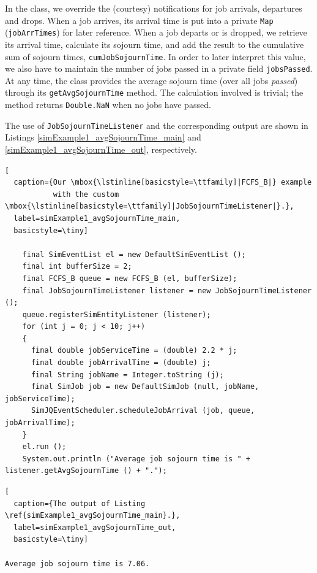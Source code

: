\documentclass[12pt]{book}
\begin{document}
In the class, we override the (courtesy) notifications for job arrivals,
  departures and drops.
When a job arrives, its arrival time is put into a private \lstinline|Map| (\lstinline|jobArrTimes|)
  for later reference.
When a job departs or is dropped,
  we retrieve its arrival time,
  calculate its sojourn time,
  and add the result to the cumulative sum
  of sojourn times, \lstinline|cumJobSojournTime|.
In order to later interpret this value,
  we also have to maintain the number of jobs passed
  in a private field \lstinline|jobsPassed|.
At any time,
  the class provides the average sojourn time (over all jobs {\em passed\/})
  through its \lstinline|getAvgSojournTime| method.
The calculation involved is trivial;
  the method returns \lstinline|Double.NaN| when
  no jobs have passed.

The use of \lstinline|JobSojournTimeListener| and the corresponding output
  are shown in Listings \ref{simExample1_avgSojournTime_main}
  and \ref{simExample1_avgSojournTime_out}, respectively.

\begin{lstlisting}[
  caption={Our \mbox{\lstinline[basicstyle=\ttfamily]|FCFS_B|} example
           with the custom \mbox{\lstinline[basicstyle=\ttfamily]|JobSojournTimeListener|}.},
  label=simExample1_avgSojournTime_main,
  basicstyle=\tiny]

    final SimEventList el = new DefaultSimEventList ();
    final int bufferSize = 2;
    final FCFS_B queue = new FCFS_B (el, bufferSize);
    final JobSojournTimeListener listener = new JobSojournTimeListener ();
    queue.registerSimEntityListener (listener);
    for (int j = 0; j < 10; j++)
    {
      final double jobServiceTime = (double) 2.2 * j;
      final double jobArrivalTime = (double) j;
      final String jobName = Integer.toString (j);
      final SimJob job = new DefaultSimJob (null, jobName, jobServiceTime);
      SimJQEventScheduler.scheduleJobArrival (job, queue, jobArrivalTime);
    }
    el.run ();
    System.out.println ("Average job sojourn time is " + listener.getAvgSojournTime () + ".");

\end{lstlisting}

\begin{lstlisting}[
  caption={The output of Listing \ref{simExample1_avgSojournTime_main}.},
  label=simExample1_avgSojournTime_out,
  basicstyle=\tiny]

Average job sojourn time is 7.06.

\end{lstlisting}
\end{document}
